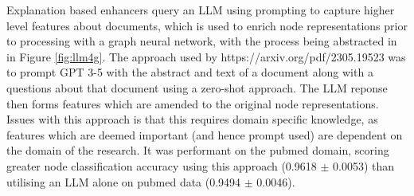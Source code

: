\documentclass[../main.tex]{subfiles}
\begin{document}
    Explanation based enhancers query an LLM using prompting to capture higher level features about documents, which is used to enrich node representations prior to processing with a graph neural network, with the process being abstracted in in Figure \ref{fig:llm4g}. The approach used by https://arxiv.org/pdf/2305.19523 was to prompt GPT 3-5 with the abstract and text of a document along with a questions about that document using a zero-shot approach. The LLM reponse then forms features which are amended to the original node representations. Issues with this approach is that this requires domain specific knowledge, as features which are deemed important (and hence prompt used) are dependent on the domain of the research. It was performant on the pubmed domain, scoring greater node classification accuracy using this approach (0.9618 $\pm$ 0.0053) than utilising an LLM alone on pubmed data (0.9494 $\pm$ 0.0046).   
\end{document}
